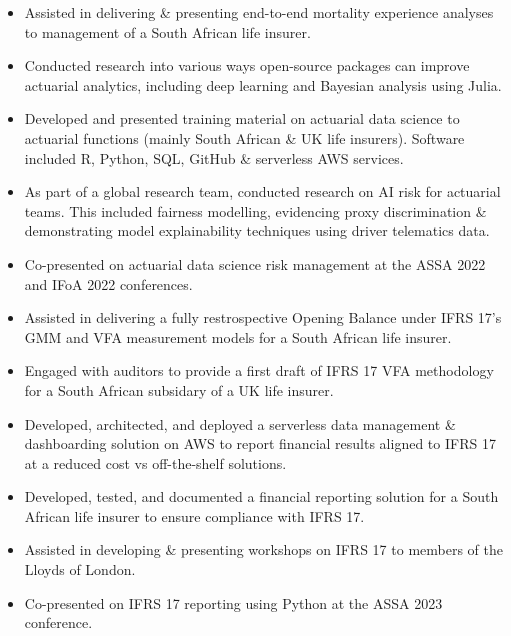 \documentclass[10pt,a4paper,ragged2e,withhyper]{altacv}
\begin{document}
\begin{paracol}{2}
  \smallskip
  \smallskip
  \begin{itemize}[label=$\circ$, leftmargin=0.9cm, labelsep=0.43cm]
    \item Assisted in delivering \& presenting end-to-end mortality experience analyses to management of a South African life insurer.
    \item Conducted research into various ways open-source packages can improve \\actuarial analytics, including deep learning and Bayesian analysis using Julia.
    \item Developed and presented training material on actuarial data science to actuarial functions (mainly South African \& UK life insurers). Software included R, Python, SQL, GitHub \& serverless AWS services. 
    \item As part of a global research team, conducted research on AI risk for actuarial teams. This included fairness modelling, evidencing proxy discrimination \& demonstrating model explainability techniques using driver telematics data. 
    \item Co-presented on actuarial data science risk management at the ASSA 2022 and IFoA 2022 conferences. 
  \end{itemize}

  \begin{itemize}[label=$\circ$, leftmargin=0.9cm, labelsep=0.43cm]
    \item Assisted in delivering a fully restrospective Opening Balance under IFRS 17's GMM and VFA measurement models for a South African life insurer. 
    \item Engaged with auditors to provide a first draft of IFRS 17 VFA methodology for a South African subsidary of a UK life insurer. 
    \item Developed, architected, and deployed a serverless data management \&\\ dashboarding solution on AWS to report financial results aligned to IFRS 17 at a reduced cost vs off-the-shelf solutions.
    \item Developed, tested, and documented a financial reporting solution for a South African life insurer to ensure compliance with IFRS 17.
    \item Assisted in developing \& presenting workshops on IFRS 17 to members of the Lloyds of London. 
    \item Co-presented on IFRS 17 reporting using Python at the ASSA 2023 \\conference. 
  \end{itemize}


\end{paracol}
\end{document}
